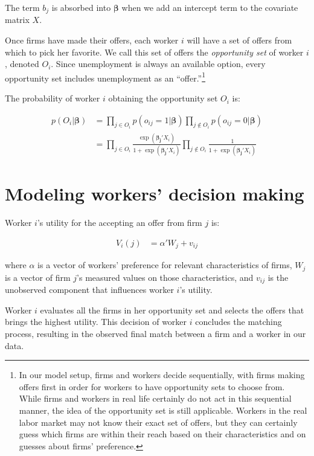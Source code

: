 The term $b_j$ is absorbed into $\bm{\beta}$ when we add an intercept term to the covariate matrix $X$.

Once firms have made their offers, each worker $i$ will have a set of offers
from which to pick her favorite. We call this set of offers the
\textit{opportunity set} of worker $i$, denoted $O_i$. Since unemployment is
always an available option, every opportunity set includes unemployment as an ``offer.''\footnote{In our model setup, firms and workers decide sequentially, with firms making
offers first in order for workers to have opportunity sets to choose from. While
firms and workers in real life certainly do not act in this sequential manner,
the idea of the opportunity set is still applicable. Workers in the real
labor market may not know their exact set of offers, but they can certainly
guess which firms are within their reach based on their characteristics and on
guesses about firms' preference.}

The probability of worker $i$ obtaining the opportunity set $O_i$ is:

\begin{align}
p(O_i | \bm{\beta}) &= \prod_{j \in O_i} p(o_{ij} = 1 | \bm{\beta}) \prod_{j \notin O_i} p(o_{ij} = 0 | \bm{\beta}) \\
&= \prod_{j \in O_i} \frac{\exp(\bm{\beta_j} ' X_i)}{1 + \exp(\bm{\beta_j}' X_i)}
 \prod_{j \notin O_i} \frac{1}{1 + \exp(\bm{\beta_j}' X_i)} \label{eq:conditional_probability_of_offer}
\end{align}

\section{Modeling workers' decision making}

Worker $i$'s utility for the accepting an offer from firm $j$ is:

\begin{align}
V_i(j) &= \alpha' W_{j} + v_{ij}
\end{align}

where $\alpha$ is a vector of workers' preference for relevant characteristics of
firms, $W_j$ is a vector of firm $j$'s measured values on those characteristics,
and $v_{ij}$ is the unobserved component that influences worker $i$'s utility.

Worker $i$ evaluates all the firms in her opportunity set and selects the offers
that brings the highest utility. This decision of worker $i$ concludes the matching process, resulting in the observed final match between a firm and a worker in our data.

